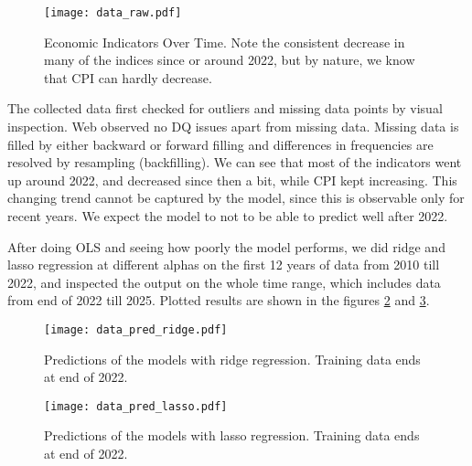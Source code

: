 \documentclass{article}
\begin{document}
\begin{figure}[ht]
      \centering
      \texttt{[image: data\_raw.pdf]}
      \caption{Economic Indicators Over Time.
            Note the consistent decrease in many of the indices since or around 2022,
            but by nature, we know that CPI can hardly decrease.}
      \label{fig:economic_indicators}
\end{figure}

The collected data first checked for outliers and missing data points by visual inspection.
Web observed no DQ issues apart from missing data.
Missing data is filled by either backward or forward filling
and differences in frequencies are resolved by resampling (backfilling).
We can see that most of the indicators went up around 2022,
and decreased since then a bit, while CPI kept increasing.
This changing trend cannot be captured by the model,
since this is observable only for recent years.
We expect the model to not to be able to predict well after 2022.

After doing OLS and seeing how poorly the model performs,
we did ridge and lasso regression at different alphas
on the first 12 years of data from 2010 till 2022,
and inspected the output on the whole time range,
which includes data from end of 2022 till 2025.
Plotted results are shown in
the figures \ref{fig:ridge_predictions} and \ref{fig:lasso_predictions}.

\begin{figure}[ht]
      \centering
      \texttt{[image: data\_pred\_ridge.pdf]}
      \caption{Predictions of the models with ridge regression.
            Training data ends at end of 2022.}
      \label{fig:ridge_predictions}
\end{figure}


\begin{figure}[ht]
      \centering
      \texttt{[image: data\_pred\_lasso.pdf]}
      \caption{Predictions of the models with lasso regression.
            Training data ends at end of 2022.}
      \label{fig:lasso_predictions}
\end{figure}
\end{document}
